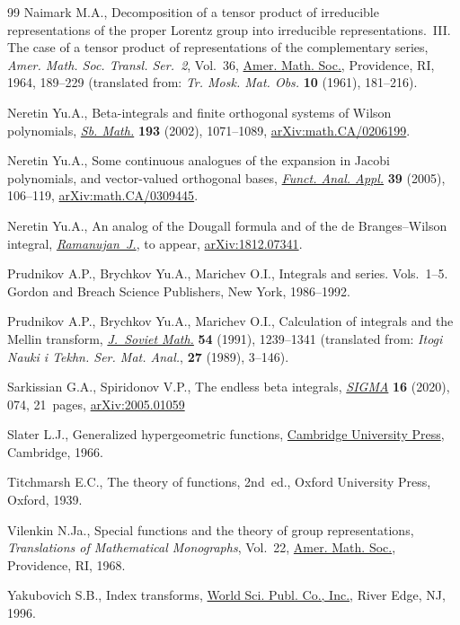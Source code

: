 \documentclass[pdftex]{sigma}
\numberwithin{equation}{section}
\begin{document}
\begin{thebibliography}{99}
Naimark M.A., Decomposition of a tensor product of irreducible representations
 of the proper Lorentz group into irreducible representations.~{III}. {T}he
 case of a tensor product of representations of the complementary series, \textit{Amer. Math. Soc. Transl. Ser.~2}, Vol.~36,
 \href{https://doi.org/10.1090/trans2/036/04}{Amer. Math. Soc.}, Providence, RI, 1964, 189--229 (translated from: \textit{Tr. Mosk. Mat. Obs.} \textbf{10} (1961), 181--216).

Neretin Yu.A., Beta-integrals and finite orthogonal systems of {W}ilson
 polynomials, \href{https://doi.org/10.1070/SM2002v193n07ABEH000670}{\textit{Sb. Math.}} \textbf{193} (2002), 1071--1089,
 \href{https://arxiv.org/abs/math.CA/0206199}{arXiv:math.CA/0206199}.

Neretin Yu.A., Some continuous analogues of the expansion in Jacobi polynomials,
 and vector-valued orthogonal bases, \href{https://doi.org/10.1007/s10688-005-0023-7}{\textit{Funct. Anal. Appl.}} \textbf{39}
 (2005), 106--119, \href{https://arxiv.org/abs/math.CA/0309445}{arXiv:math.CA/0309445}.

Neretin Yu.A., An analog of the {D}ougall formula and of the de
 {B}ranges--{W}ilson integral, \href{https://doi.org/10.1007/s11139-019-00218-0}{\textit{Ramanujan~J.}}, {t}o appear,
 \href{https://arxiv.org/abs/1812.07341}{arXiv:1812.07341}.

Prudnikov A.P., Brychkov Yu.A., Marichev O.I., Integrals and series. Vols.~1--5.
 Gordon and Breach Science Publishers, New York, 1986--1992.

Prudnikov A.P., Brychkov Yu.A., Marichev O.I., Calculation of integrals and the
 {M}ellin transform, \href{https://doi.org/10.1007/BF01373648}{\textit{J.~Soviet Math.}} \textbf{54} (1991), 1239--1341
 (translated from: \textit{Itogi Nauki i Tekhn. Ser. Mat. Anal.}, \textbf{27} (1989), 3--146).

Sarkissian G.A., Spiridonov V.P., The endless beta integrals, \href{https://doi.org/10.3842/SIGMA.2020.074}{\textit{SIGMA}}
 \textbf{16} (2020), 074, 21~pages, \href{https://arxiv.org/abs/2005.01059}{arXiv:2005.01059}

Slater L.J., Generalized hypergeometric functions, \href{https://doi.org/10.1002/zamm.19660460536}{Cambridge University Press},
 Cambridge, 1966.

Titchmarsh E.C., The theory of functions, 2nd~ed., Oxford University Press,
 Oxford, 1939.

Vilenkin N.Ja., Special functions and the theory of group representations,
 \textit{Translations of Mathematical Monographs}, Vol.~22, \href{https://doi.org/10.1090/mmono/022}{Amer. Math. Soc.},
 Providence, RI, 1968.

Yakubovich S.B., Index transforms, \href{https://doi.org/10.1142/9789812831064}{World Sci. Publ. Co., Inc.}, River Edge, NJ,
 1996.

\end{thebibliography}\LastPageEnding
\end{document}
